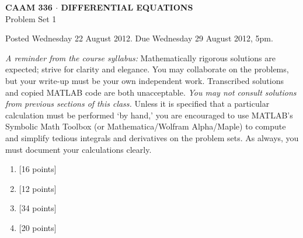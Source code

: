 \documentclass[10pt]{article}
\begin{document}
\vspace*{-5em}
\begin{center}
\large \textsf{\textbf{CAAM 336 $\cdot$ DIFFERENTIAL EQUATIONS}\\[0.5em]
Problem Set 1 }
\end{center}

Posted Wednesday 22 August 2012.  Due Wednesday 29 August 2012, 5pm.

{\small \emph{A reminder from the course syllabus:}  
Mathematically rigorous solutions are expected; strive for clarity and elegance.
You may collaborate on the problems, but your write-up must be your own independent work.
Transcribed solutions and copied MATLAB code are both unacceptable.
\emph{You may not consult solutions from previous sections of this class.}
 Unless it is specified that a particular calculation must be performed `by hand,' you are
encouraged to use MATLAB's Symbolic Math Toolbox (or Mathematica/Wolfram Alpha/Maple)
to compute and simplify tedious integrals and derivatives on the problem sets.
As always, you must document your calculations clearly.}

\begin{enumerate}
\item {[16 points]}\\  

\vspace*{.5em}
\item {[12 points]}\\  

\vspace*{.5em}
\item {[34 points]}\\  

\vspace*{2em}

\item {[20 points]}\\  


\end{enumerate}
\end{document}
